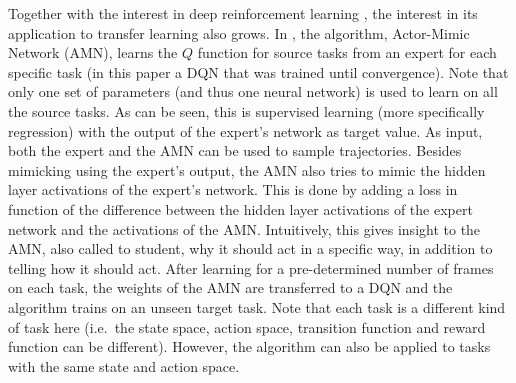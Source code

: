 Together with the interest in deep reinforcement learning \parencite{Mnih2015Human-levelLearning,Mnih2016AsynchronousLearning}, the interest in its application to transfer learning also grows.
In \cite{DBLP:journals/corr/ParisottoBS15}, the algorithm, Actor-Mimic Network (AMN), learns the $Q$ function for source tasks from an expert for each specific task (in this paper a DQN that was trained until convergence).
Note that only one set of parameters (and thus one neural network) is used to learn on all the source tasks.
As can be seen, this is supervised learning (more specifically regression) with the output of the expert's network as target value.
As input, both the expert and the AMN can be used to sample trajectories.
Besides mimicking using the expert's output, the AMN also tries to mimic the hidden layer activations of the expert's network.
This is done by adding a loss in function of the difference between the hidden layer activations of the expert network and the activations of the AMN.
Intuitively, this gives insight to the AMN, also called to student, why it should act in a specific way, in addition to telling how it should act.
After learning for a pre-determined number of frames on each task, the weights of the AMN are transferred to a DQN and the algorithm trains on an unseen target task.
Note that each task is a different kind of task here (i.e.\ the state space, action space, transition function and reward function can be different).
However, the algorithm can also be applied to tasks with the same state and action space.

